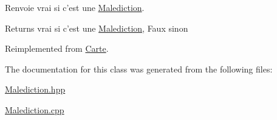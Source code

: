 Renvoie vrai si c'est une \hyperlink{class_malediction}{Malediction}. 

\begin{DoxyReturn}{Returns}
vrai si c'est une \hyperlink{class_malediction}{Malediction}, Faux sinon 
\end{DoxyReturn}


Reimplemented from \hyperlink{class_carte_af9c84ec45b9a570d8ac8019726756ee7}{Carte}.



The documentation for this class was generated from the following files\-:\begin{DoxyCompactItemize}
\item 
\hyperlink{_malediction_8hpp}{Malediction.\-hpp}\item 
\hyperlink{_malediction_8cpp}{Malediction.\-cpp}\end{DoxyCompactItemize}
